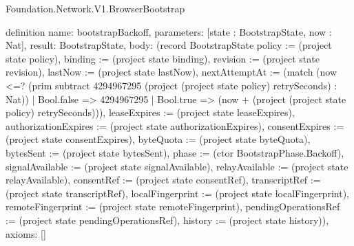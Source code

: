 \begin{lexlean}{Foundation.Network.V1.BrowserBootstrap}
\begin{semanticmodule}
definition{
  name: bootstrapBackoff,
  parameters: [state : BootstrapState, now : Nat],
  result: BootstrapState,
  body: (record BootstrapState {policy := (project state policy), binding := (project state binding), revision := (project state revision), lastNow := (project state lastNow), nextAttemptAt := (match (now <=? (prim subtract 4294967295 (project (project state policy) retrySeconds) : Nat))
    | Bool.false => 4294967295
    | Bool.true => (now + (project (project state policy) retrySeconds))), leaseExpires := (project state leaseExpires), authorizationExpires := (project state authorizationExpires), consentExpires := (project state consentExpires), byteQuota := (project state byteQuota), bytesSent := (project state bytesSent), phase := (ctor BootstrapPhase.Backoff), signalAvailable := (project state signalAvailable), relayAvailable := (project state relayAvailable), consentRef := (project state consentRef), transcriptRef := (project state transcriptRef), localFingerprint := (project state localFingerprint), remoteFingerprint := (project state remoteFingerprint), pendingOperationsRef := (project state pendingOperationsRef), history := (project state history)}),
  axioms: []
}


\end{semanticmodule}
\end{lexlean}

